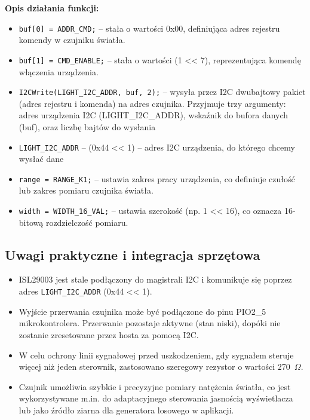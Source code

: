 \documentclass[a4paper,12pt]{report}
\begin{document}
\textbf{Opis działania funkcji:}
\begin{itemize}
    \item \texttt{buf[0] = ADDR\_CMD;} – stała o wartości 0x00, definiująca adres rejestru komendy w czujniku światła.
    \item \texttt{buf[1] = CMD\_ENABLE;} – stała o wartości (1 << 7), reprezentująca komendę włączenia urządzenia.
    \item \texttt{I2CWrite(LIGHT\_I2C\_ADDR, buf, 2);} – wysyła przez I2C dwubajtowy pakiet (adres rejestru i komenda) na adres czujnika. Przyjmuje trzy argumenty: adres urządzenia I2C (LIGHT\_I2C\_ADDR), wskaźnik do bufora danych (buf), oraz liczbę bajtów do wysłania
    \item \texttt{LIGHT\_I2C\_ADDR} – (0x44 << 1) – adres I2C urządzenia, do którego chcemy wysłać dane
    \item \texttt{range = RANGE\_K1;} – ustawia zakres pracy urządzenia, co definiuje czułość lub zakres pomiaru czujnika światła.
    \item \texttt{width = WIDTH\_16\_VAL;} – ustawia szerokość (np. 1 << 16), co oznacza 16-bitową rozdzielczość pomiaru.
\end{itemize}

\subsection*{Uwagi praktyczne i integracja sprzętowa}

\begin{itemize}
    \item ISL29003 jest stale podłączony do magistrali I2C i komunikuje się poprzez adres \texttt{LIGHT\_I2C\_ADDR} (0x44 << 1).
    \item Wyjście przerwania czujnika może być podłączone do pinu PIO2\_5 mikrokontrolera. Przerwanie pozostaje aktywne (stan niski), dopóki nie zostanie zresetowane przez hosta za pomocą I2C.
    \item W celu ochrony linii sygnałowej przed uszkodzeniem, gdy sygnałem steruje więcej niż jeden sterownik, zastosowano szeregowy rezystor o wartości 270~$\Omega$.
    \item Czujnik umożliwia szybkie i precyzyjne pomiary natężenia światła, co jest wykorzystywane m.in. do adaptacyjnego sterowania jasnością wyświetlacza lub jako źródło ziarna dla generatora losowego w aplikacji.
\end{itemize}
\end{document}
